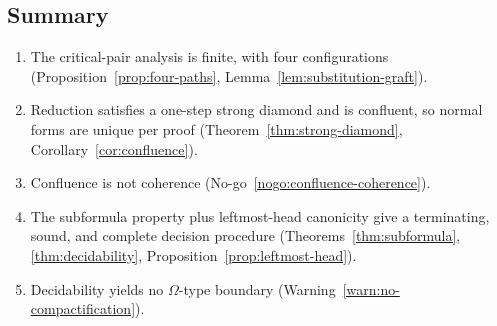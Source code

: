\subsection{Summary}

\begin{enumerate}
\item The critical-pair analysis is finite, with four configurations
  (Proposition~\ref{prop:four-paths}, Lemma~\ref{lem:substitution-graft}).
\item Reduction satisfies a one-step strong diamond and is confluent, so normal forms are
  unique per proof (Theorem~\ref{thm:strong-diamond}, Corollary~\ref{cor:confluence}).
\item Confluence is not coherence (No-go~\ref{nogo:confluence-coherence}).
\item The subformula property plus leftmost-head canonicity give a terminating, sound, and
  complete decision procedure (Theorems~\ref{thm:subformula}, \ref{thm:decidability},
  Proposition~\ref{prop:leftmost-head}).
\item Decidability yields no $\Omega$-type boundary
  (Warning~\ref{warn:no-compactification}).
\end{enumerate}
